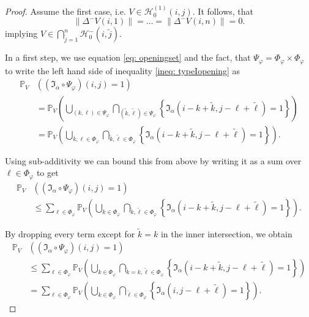 \documentclass[a4paper,12pt]{article}
\newcommand{\norm}[1]{\lVert#1\rVert}
\theoremstyle{plain}
\theoremstyle{definition}
\begin{document}
\begin{proof}
	Assume the first case, i.e. $V \in \mathcal{H}_0^{(1)}(i, j)$. It follows, that
	\begin{equation*}
		\norm{\Delta^- V(i, 1)} = \ldots = \norm{\Delta^- V(i, n)} = 0.
	\end{equation*}
	implying $V \in \bigcap_{\tilde{j} = 1}^n \mathcal{H}_0^-(i, \tilde{j})$.
	
	In a first step, we use equation \eqref{eq: openingset} and the fact, that $\Psi_\varphi = \Phi_\varphi \times \Phi_\varphi$ to write the left hand side of inequality \eqref{ineq: typeIopening} as
	\begin{align*}
		\mathbb{P}_V&\left( (\mathfrak{I}_\alpha \circ \Psi_\varphi)(i, j) = 1 \right) \\
		&= \mathbb{P}_V\left( \bigcup_{(k, \ell) \in \Psi_\varphi} \bigcap_{(\tilde{k}, \tilde{\ell}) \in \Psi_\varphi} \left\{ \mathfrak{I}_\alpha(i - k + \tilde{k}, j - \ell + \tilde{\ell}) = 1 \right\} \right) \\
		&= \mathbb{P}_V\left( \bigcup_{k, \ell \in \Phi_\varphi} \bigcap_{\tilde{k}, \tilde{\ell} \in \Phi_\varphi} \left\{ \mathfrak{I}_\alpha(i - k + \tilde{k}, j - \ell + \tilde{\ell}) = 1 \right\} \right).
	\end{align*}
	
	Using sub-additivity we can bound this from above by writing it as a sum over $\ell \in \Phi_\varphi$ to get
	\begin{align*}
		\mathbb{P}_V&\left( (\mathfrak{I}_\alpha \circ \Psi_\varphi)(i, j) = 1 \right) \\
		&\leq \sum_{\ell \in \Phi_\varphi} \mathbb{P}_V\left( \bigcup_{k \in \Phi_\varphi} \bigcap_{\tilde{k}, \tilde{\ell} \in \Phi_\varphi} \left\{ \mathfrak{I}_\alpha(i - k + \tilde{k}, j - \ell + \tilde{\ell}) = 1 \right\} \right).
	\end{align*}
	
	By dropping every term except for $\tilde{k} = k$ in the inner intersection, we obtain
	\begin{align*}
		\mathbb{P}_V&\left( (\mathfrak{I}_\alpha \circ \Psi_\varphi)(i, j) = 1 \right) \\
		&\leq \sum_{\ell \in \Phi_\varphi} \mathbb{P}_V\left( \bigcup_{k \in \Phi_\varphi} \bigcap_{\tilde{k} = k, \tilde{\ell} \in \Phi_\varphi} \left\{ \mathfrak{I}_\alpha(i - k + \tilde{k}, j - \ell + \tilde{\ell}) = 1 \right\} \right) \\
		&= \sum_{\ell \in \Phi_\varphi} \mathbb{P}_V\left( \bigcup_{k \in \Phi_\varphi} \bigcap_{\tilde{\ell} \in \Phi_\varphi} \left\{ \mathfrak{I}_\alpha(i, j - \ell + \tilde{\ell}) = 1 \right\} \right).
	\end{align*}
	

\end{proof}
\end{document}
